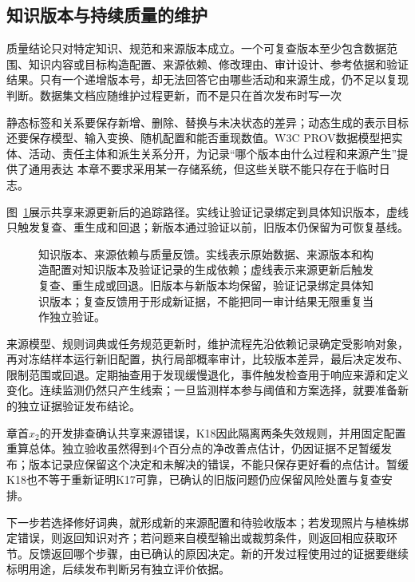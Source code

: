 \subsection{知识版本与持续质量的维护}
\label{sec:knowledge-quality-assessment-correction-version-maintenance}

质量结论只对特定知识、规范和来源版本成立。一个可复查版本至少包含数据范围、知识内容或目标构造配置、来源依赖、修改理由、审计设计、参考依据和验证结果。只有一个递增版本号，却无法回答它由哪些活动和来源生成，仍不足以复现判断。数据集文档应随维护过程更新，而不是只在首次发布时写一次

静态标签和关系要保存新增、删除、替换与未决状态的差异；动态生成的表示目标还要保存模型、输入变换、随机配置和能否重现数值。W3C PROV数据模型把实体、活动、责任主体和派生关系分开，为记录“哪个版本由什么过程和来源产生”提供了通用表达 本章不要求采用某一存储系统，但这些关联不能只存在于临时日志。

图~\ref{fig:knowledge-quality-assessment-correction-version-feedback}展示共享来源更新后的追踪路径。实线让验证记录绑定到具体知识版本，虚线只触发复查、重生成和回退；新版本通过验证以前，旧版本仍保留为可恢复基线。

\begin{figure}[htbp]
  \centering
  
  \caption{知识版本、来源依赖与质量反馈。实线表示原始数据、来源版本和构造配置对知识版本及验证记录的生成依赖；虚线表示来源更新后触发复查、重生成或回退。旧版本与新版本均保留，验证记录绑定具体知识版本；复查反馈用于形成新证据，不能把同一审计结果无限重复当作独立验证。}
  \label{fig:knowledge-quality-assessment-correction-version-feedback}
\end{figure}

来源模型、规则词典或任务规范更新时，维护流程先沿依赖记录确定受影响对象，再对冻结样本运行新旧配置，执行局部概率审计，比较版本差异，最后决定发布、限制范围或回退。定期抽查用于发现缓慢退化，事件触发检查用于响应来源和定义变化。连续监测仍然只产生线索；一旦监测样本参与阈值和方案选择，就要准备新的独立证据验证发布结论。

章首$x_2$的开发排查确认共享来源错误，K18因此隔离两条失效规则，并用固定配置重算总体。独立验收虽然得到4个百分点的净改善点估计，仍因证据不足暂缓发布；版本记录应保留这个决定和未解决的错误，不能只保存更好看的点估计。暂缓K18也不等于重新证明K17可靠，已确认的旧版问题仍应保留风险处置与复查安排。

下一步若选择修好词典，就形成新的来源配置和待验收版本；若发现照片与植株绑定错误，则返回知识对齐；若问题来自模型输出或裁剪条件，则返回相应获取环节。反馈返回哪个步骤，由已确认的原因决定。新的开发过程使用过的证据要继续标明用途，后续发布判断另有独立评价依据。

